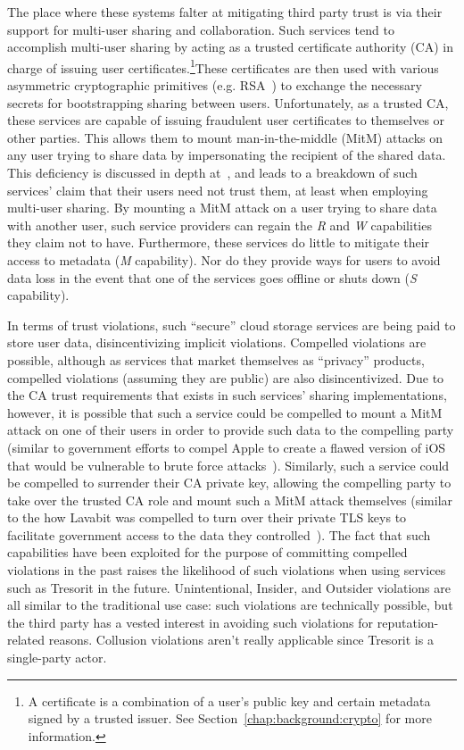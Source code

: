 The place where these systems falter at mitigating third party trust
is via their support for multi-user sharing and collaboration. Such
services tend to accomplish multi-user sharing by acting as a trusted
certificate authority (CA) in charge of issuing user
certificates.\footnote{A certificate is a combination of a user's
  public key and certain metadata signed by a trusted issuer. See
  Section~\ref{chap:background:crypto} for more information.}These
certificates are then used with various asymmetric cryptographic
primitives (e.g. RSA~\cite{rivest1978}) to exchange the necessary
secrets for bootstrapping sharing between users. Unfortunately, as a
trusted CA, these services are capable of issuing fraudulent user
certificates to themselves or other parties. This allows them to mount
man-in-the-middle (MitM) attacks on any user trying to share data by
impersonating the recipient of the shared data. This deficiency is
discussed in depth at~\cite{wilson2014}, and leads to a breakdown of
such services' claim that their users need not trust them, at least
when employing multi-user sharing. By mounting a MitM attack on a user
trying to share data with another user, such service providers can
regain the \emph{R} and \emph{W} capabilities they claim not to
have. Furthermore, these services do little to mitigate their access
to metadata (\emph{M} capability). Nor do they provide ways for users
to avoid data loss in the event that one of the services goes offline
or shuts down (\emph{S} capability).

In terms of trust violations, such ``secure'' cloud storage services
are being paid to store user data, disincentivizing implicit
violations. Compelled violations are possible, although as services
that market themselves as ``privacy'' products, compelled violations
(assuming they are public) are also disincentivized. Due to the CA
trust requirements that exists in such services' sharing
implementations, however, it is possible that such a service could be
compelled to mount a MitM attack on one of their users in order to
provide such data to the compelling party (similar to government
efforts to compel Apple to create a flawed version of iOS that would
be vulnerable to brute force attacks~\cite{ars-cookvfbi}). Similarly,
such a service could be compelled to surrender their CA private key,
allowing the compelling party to take over the trusted CA role and
mount such a MitM attack themselves (similar to the how Lavabit was
compelled to turn over their private TLS keys to facilitate government
access to the data they controlled~\cite{levsion-lavabit}). The fact
that such capabilities have been exploited for the purpose of
committing compelled violations in the past raises the likelihood of
such violations when using services such as Tresorit in the
future. Unintentional, Insider, and Outsider violations are all
similar to the traditional use case: such violations are technically
possible, but the third party has a vested interest in avoiding such
violations for reputation-related reasons. Collusion violations aren't
really applicable since Tresorit is a single-party actor.

